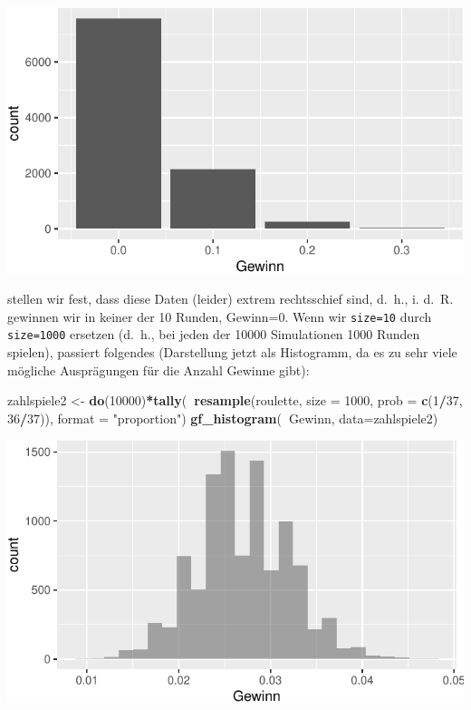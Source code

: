 \documentclass[12pt,ngerman,paper=a4,pagesize,DIV=13]{scrreprt}
\newenvironment{Shaded}{\begin{snugshade}}{\end{snugshade}}
\newcommand{\DataTypeTok}[1]{\textcolor[rgb]{0.13,0.29,0.53}{#1}}
\newcommand{\DecValTok}[1]{\textcolor[rgb]{0.00,0.00,0.81}{#1}}
\newcommand{\KeywordTok}[1]{\textcolor[rgb]{0.13,0.29,0.53}{\textbf{#1}}}
\newcommand{\NormalTok}[1]{#1}
\newcommand{\OperatorTok}[1]{\textcolor[rgb]{0.81,0.36,0.00}{\textbf{#1}}}
\newcommand{\StringTok}[1]{\textcolor[rgb]{0.31,0.60,0.02}{#1}}
\begin{document}
\includegraphics{DatenerhebungStatistik-Uebung_files/figure-latex/unnamed-chunk-80-1.pdf}

stellen wir fest, dass diese Daten (leider) extrem rechtsschief sind,
d.~h., i. d.~R. gewinnen wir in keiner der 10 Runden, Gewinn=0. Wenn wir
\texttt{size=10} durch \texttt{size=1000} ersetzen (d.~h., bei jeden der
10000 Simulationen 1000 Runden spielen), passiert folgendes (Darstellung
jetzt als Histogramm, da es zu sehr viele mögliche Ausprägungen für die
Anzahl Gewinne gibt):

\begin{Shaded}
\begin{Highlighting}[]
\NormalTok{zahlspiele2 <-}\StringTok{ }\KeywordTok{do}\NormalTok{(}\DecValTok{10000}\NormalTok{)}\OperatorTok{*}\KeywordTok{tally}\NormalTok{(}\OperatorTok{~}\KeywordTok{resample}\NormalTok{(roulette, }\DataTypeTok{size =} \DecValTok{1000}\NormalTok{, }
                  \DataTypeTok{prob =} \KeywordTok{c}\NormalTok{(}\DecValTok{1}\OperatorTok{/}\DecValTok{37}\NormalTok{, }\DecValTok{36}\OperatorTok{/}\DecValTok{37}\NormalTok{)), }\DataTypeTok{format =} \StringTok{"proportion"}\NormalTok{)}
\KeywordTok{gf_histogram}\NormalTok{(}\OperatorTok{~}\NormalTok{Gewinn, }\DataTypeTok{data=}\NormalTok{zahlspiele2)}
\end{Highlighting}
\end{Shaded}

\includegraphics{DatenerhebungStatistik-Uebung_files/figure-latex/unnamed-chunk-81-1.pdf}
\end{document}
